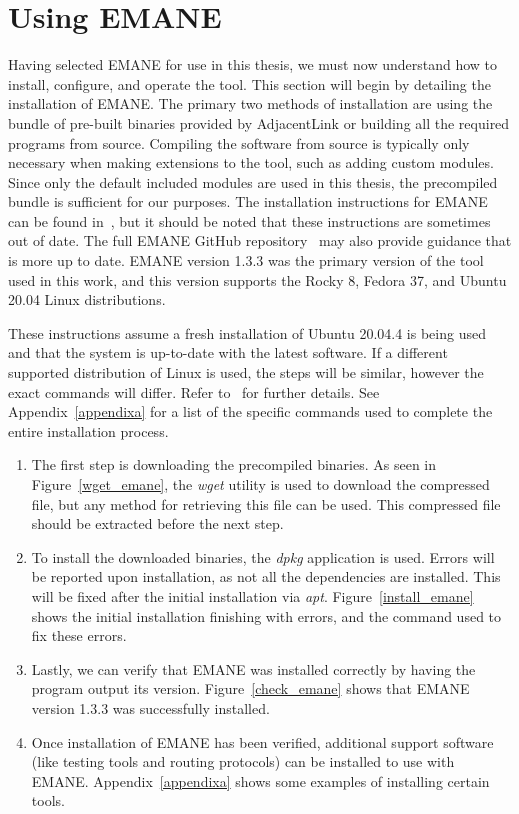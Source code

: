 \section{Using EMANE}
Having selected EMANE for use in this thesis, we must now understand how to install, configure, and operate the tool.
This section will begin by detailing the installation of EMANE.
The primary two methods of installation are using the bundle of pre-built binaries provided by AdjacentLink or building all the required programs from source.
Compiling the software from source is typically only necessary when making extensions to the tool, such as adding custom modules.
Since only the default included modules are used in this thesis, the precompiled bundle is sufficient for our purposes.
The installation instructions for EMANE can be found in~\cite{emane_tutorial}, but it should be noted that these instructions are sometimes out of date.
The full EMANE GitHub repository~\cite{emane_git} may also provide guidance that is more up to date.
EMANE version 1.3.3 was the primary version of the tool used in this work, and this version supports the Rocky 8, Fedora 37, and Ubuntu 20.04 Linux distributions.\par
These instructions assume a fresh installation of Ubuntu 20.04.4 is being used and that the system is up-to-date with the latest software.
If a different supported distribution of Linux is used, the steps will be similar, however the exact commands will differ. Refer to~\cite{emane_tutorial,emane_git} for further details.
See Appendix~\ref{appendixa} for a list of the specific commands used to complete the entire installation process.
\begin{enumerate}
    \item The first step is downloading the precompiled binaries. As seen in Figure~\ref{wget_emane}, the \textit{wget} utility is used to download the compressed file, but any method for retrieving this file can be used. This compressed file should be extracted before the next step.
    \item To install the downloaded binaries, the \textit{dpkg} application is used. Errors will be reported upon installation, as not all the dependencies are installed. This will be fixed after the initial installation via \textit{apt}. Figure~\ref{install_emane} shows the initial installation finishing with errors, and the command used to fix these errors.
    \item Lastly, we can verify that EMANE was installed correctly by having the program output its version. Figure~\ref{check_emane} shows that EMANE version 1.3.3 was successfully installed.
    \item Once installation of EMANE has been verified, additional support software (like testing tools and routing protocols) can be installed to use with EMANE. Appendix~\ref{appendixa} shows some examples of installing certain tools.
\end{enumerate}

